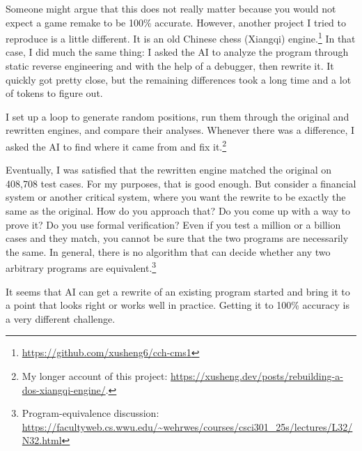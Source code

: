 \documentclass[10pt]{article}
\begin{document}
Someone might argue that this does not really matter because you would not
expect a game remake to be 100\% accurate. However, another project I tried
to reproduce is a little different. It is an old Chinese chess (Xiangqi)
engine.\footnote{\url{https://github.com/xusheng6/cch-cms1}} In that case, I did much the same thing: I asked the AI to analyze the
program through static reverse engineering and with the help of a debugger,
then rewrite it. It quickly got pretty close, but the remaining differences
took a long time and a lot of tokens to figure out.

I set up a loop to generate random positions, run them through the original
and rewritten engines, and compare their analyses. Whenever there was a
difference, I asked the AI to find where it came from and fix it.\footnote{My longer account of this
project: \url{https://xusheng.dev/posts/rebuilding-a-dos-xiangqi-engine/}.}

Eventually, I was satisfied that the rewritten engine matched the original on
408,708 test cases. For my purposes, that is good enough. But consider a
financial system or another critical system, where you want the rewrite to be
exactly the same as the original. How do you approach that? Do you come up
with a way to prove it? Do you use formal verification? Even if you test a
million or a billion cases and they match, you cannot be sure that the two
programs are necessarily the same. In general, there is no algorithm that can
decide whether any two arbitrary programs are equivalent.\footnote{Program-equivalence discussion:
\url{https://facultyweb.cs.wwu.edu/~wehrwes/courses/csci301_25s/lectures/L32/N32.html}}

It seems that AI can get a rewrite of an existing program started and bring it
to a point that looks right or works well in practice. Getting it to 100\%
accuracy is a very different challenge.
\end{document}

